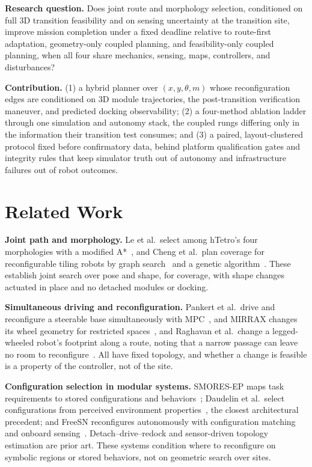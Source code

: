 \documentclass[conference]{IEEEtran}
\begin{document}
\textbf{Research question.} Does joint route and morphology selection, conditioned on full 3D transition feasibility and on sensing uncertainty at the transition site, improve mission completion under a fixed deadline relative to route-first adaptation, geometry-only coupled planning, and feasibility-only coupled planning, when all four share mechanics, sensing, maps, controllers, and disturbances?

\textbf{Contribution.} (1) a hybrid planner over $(x, y, \theta, m)$ whose reconfiguration edges are conditioned on 3D module trajectories, the post-transition verification maneuver, and predicted docking observability; (2) a four-method ablation ladder through one simulation and autonomy stack, the coupled rungs differing only in the information their transition test consumes; and (3) a paired, layout-clustered protocol fixed before confirmatory data, behind platform qualification gates and integrity rules that keep simulator truth out of autonomy and infrastructure failures out of robot outcomes.

\section{Related Work}

\textbf{Joint path and morphology.} Le et al.\ select among hTetro's four morphologies with a modified A*~\cite{le2018htetro}, and Cheng et al.\ plan coverage for reconfigurable tiling robots by graph search~\cite{cheng2019htetro} and a genetic algorithm~\cite{cheng2020htetro}. These establish joint search over pose and shape, for coverage, with shape changes actuated in place and no detached modules or docking.

\textbf{Simultaneous driving and reconfiguration.} Pankert et al.\ drive and reconfigure a steerable base simultaneously with MPC~\cite{pankert2022base}, and MIRRAX changes its wheel geometry for restricted spaces~\cite{cheah2023mirrax}, and Raghavan et al.\ change a legged-wheeled robot's footprint along a route, noting that a narrow passage can leave no room to reconfigure~\cite{raghavan2022legged}. All have fixed topology, and whether a change is feasible is a property of the controller, not of the site.

\textbf{Configuration selection in modular systems.} SMORES-EP maps task requirements to stored configurations and behaviors~\cite{jing2016smores}; Daudelin et al.\ select configurations from perceived environment properties~\cite{daudelin2018perception}, the closest architectural precedent; and FreeSN reconfigures autonomously with configuration matching and onboard sensing~\cite{tu2026freesn}. Detach--drive--redock and sensor-driven topology estimation are prior art. These systems condition where to reconfigure on symbolic regions or stored behaviors, not on geometric search over sites.
\end{document}
